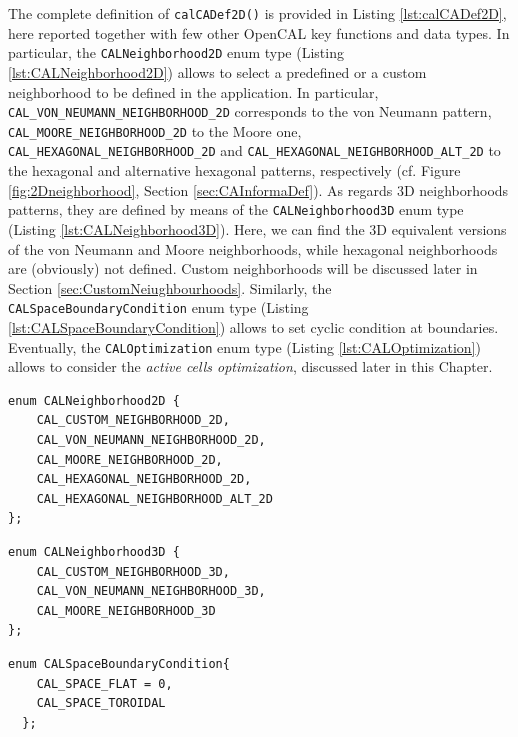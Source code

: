 The complete definition of \verb'calCADef2D()' is provided in Listing
\ref{lst:calCADef2D}, here reported together with few other OpenCAL
key functions and data types. In particular, the
\verb'CALNeighborhood2D' enum type (Listing
\ref{lst:CALNeighborhood2D}) allows to select a predefined or a custom
neighborhood to be defined in the application. In particular,
\verb'CAL_VON_NEUMANN_NEIGHBORHOOD_2D' corresponds to the von Neumann
pattern, \verb'CAL_MOORE_NEIGHBORHOOD_2D' to the Moore one,
\verb'CAL_HEXAGONAL_NEIGHBORHOOD_2D' and
\verb'CAL_HEXAGONAL_NEIGHBORHOOD_ALT_2D' to the hexagonal and
alternative hexagonal patterns, respectively (cf. Figure
\ref{fig:2Dneighborhood}, Section \ref{sec:CAInformaDef}). As regards
3D neighborhoods patterns, they are defined by means of the
\verb'CALNeighborhood3D' enum type (Listing
\ref{lst:CALNeighborhood3D}). Here, we can find the 3D equivalent
versions of the von Neumann and Moore neighborhoods, while hexagonal
neighborhoods are (obviously) not defined. Custom neighborhoods will
be discussed later in Section
\ref{sec:CustomNeiughbourhoods}. Similarly, the
\verb'CALSpaceBoundaryCondition' enum type (Listing
\ref{lst:CALSpaceBoundaryCondition}) allows to set cyclic
condition at boundaries. Eventually, the \verb'CALOptimization' enum
type (Listing \ref{lst:CALOptimization}) allows to consider the
\emph{active cells optimization}, discussed later in this Chapter.

\begin{lstlisting}[float,floatplacement=H, label=lst:CALNeighborhood2D, caption=The CALNeighborhood2D enum type., numbers=none]
  enum CALNeighborhood2D {
    CAL_CUSTOM_NEIGHBORHOOD_2D,
    CAL_VON_NEUMANN_NEIGHBORHOOD_2D,
    CAL_MOORE_NEIGHBORHOOD_2D,
    CAL_HEXAGONAL_NEIGHBORHOOD_2D,
    CAL_HEXAGONAL_NEIGHBORHOOD_ALT_2D
};
\end{lstlisting}

\begin{lstlisting}[float,floatplacement=H, label=lst:CALNeighborhood3D, caption=The CALNeighborhood3D enum type., numbers=none]
  enum CALNeighborhood3D {
    CAL_CUSTOM_NEIGHBORHOOD_3D,
    CAL_VON_NEUMANN_NEIGHBORHOOD_3D,
    CAL_MOORE_NEIGHBORHOOD_3D
};
\end{lstlisting}


\begin{lstlisting}[float,floatplacement=H, label=lst:CALSpaceBoundaryCondition, caption=The CALSpaceBoundaryCondition enum type., numbers=none]
  enum CALSpaceBoundaryCondition{
    CAL_SPACE_FLAT = 0,
    CAL_SPACE_TOROIDAL
  };
\end{lstlisting}

